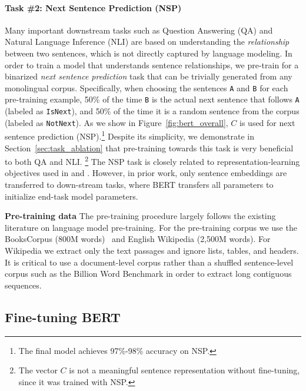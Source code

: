 \documentclass[11pt,a4paper]{article}
\begin{document}
\paragraph{Task \#2: Next Sentence Prediction (NSP)}
Many important downstream tasks such as Question Answering (QA) and Natural Language Inference (NLI) are based on understanding the {\it relationship} between two sentences, which is not directly captured by language modeling. In order to train a model that understands sentence relationships, we pre-train for a binarized {\it next sentence prediction} task that can be trivially generated from any monolingual corpus. Specifically, when choosing the sentences {\tt A} and {\tt B} for each pre-training example, 50\% of the time {\tt B} is the actual next sentence that follows {\tt A} (labeled
 as {\tt {\small IsNext}}), and 50\% of the time it is a random sentence from the corpus
 (labeled as {\tt {\small NotNext}}). 
As we show in Figure~\ref{fig:bert_overall}, $C$ is used for  next sentence prediction (NSP).\footnote{The final model achieves 97\%-98\% accuracy on NSP.} Despite its simplicity, we demonstrate in Section~\ref{sec:task_ablation} that pre-training towards this task is very beneficial to both QA and NLI.
\footnote{The vector $C$ is not a meaningful sentence representation without fine-tuning, since it was trained with NSP.}
The NSP task is closely related to representation-learning objectives used in \citet{DBLP:journals/corr/JerniteBS17} and \citet{logeswaran2018an}. However, in prior work, only sentence embeddings are transferred to down-stream tasks, where BERT transfers all parameters to initialize end-task model parameters.

\vspace{.3cm}
\noindent\textbf{Pre-training data}
The pre-training procedure largely follows the existing literature on language model pre-training. For the pre-training corpus we use the BooksCorpus (800M words)~\cite{zhu:2015} and English Wikipedia (2,500M words). For Wikipedia we extract only the text passages and ignore lists, tables, and headers. It is critical to use a document-level corpus rather than a shuffled sentence-level corpus such as the Billion Word Benchmark \cite{chelba-etal:2013:_one} in order to extract long contiguous sequences.

\subsection{Fine-tuning BERT}
\label{sec:finetuning_procedure}
\end{document}
